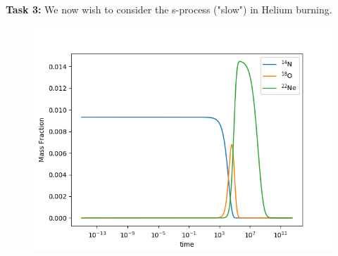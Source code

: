 \documentclass[manuscript]{aastex62}
\begin{document}
{\bf Task 3:}
We now wish to consider the s-process ("slow") in Helium burning. 

\begin{figure}
\includegraphics[scale=0.7]{task3}
\end{figure}
\end{document}
